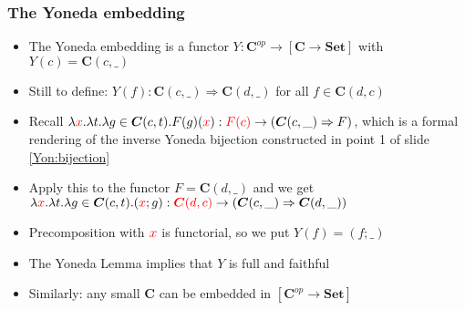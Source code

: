 \documentclass[handout]{beamer}
\newcommand{\To}{\Rightarrow}
\newcommand{\bfsf}[1]{{\boldsymbol{#1}}}
\newcommand{\Set}{\bfsf{Set}}
\newcommand{\CC}{\bfsf{C}}
\begin{document}
\frame
  {   
    \frametitle{The Yoneda embedding}\label{Yon:Embed}

 \begin{itemize}[<+->]
\item The Yoneda embedding is a functor $Y: \CC^{op} \to [\CC\to\Set]$
with $Y(c)=\CC(c,\_)$
\item Still to define: $Y(f):\CC(c,\_)\To\CC(d,\_)$ for all $f\in\CC(d,c)$
\item Recall $\lambda {\color{red}x}.\lambda t. \lambda g\in\CC(c,t). F(g)({\color{red}x}) : {\color{red}F(c)} \to (\CC(c,\_)\To F)$,
which is a formal rendering of the inverse Yoneda bijection constructed in
point 1 of slide \ref{Yon:bijection}
\item Apply this to the functor $F= \CC(d,\_)$ and we get
$\lambda {\color{red}x}.\lambda t. \lambda g\in\CC(c,t). ({\color{red}x};g) : {\color{red}\CC(d,c)} \to (\CC(c,\_)\To \CC(d,\_))$
\item Precomposition with ${\color{red}x}$ is functorial, so we put $Y(f)= (f;\_)$
\item The Yoneda Lemma implies that $Y$ is full and faithful
\item Similarly: any small $\CC$ can be embedded in $[\CC^{op}\to\Set]$
 \end{itemize}

 }
\end{document}
